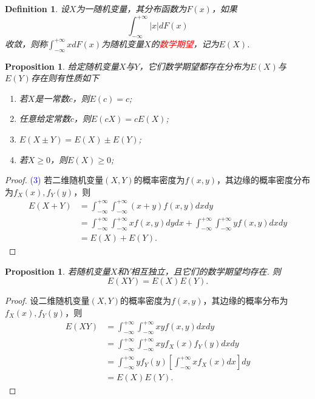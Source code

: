 \documentclass{article}
\newtheorem{proposition}[theorem]{Proposition}
\newtheorem{definition}[theorem]{Definition}
\newcommand{\redt}[1]{\textcolor{red}{#1}}
\newcommand{\bluet}[1]{\textcolor{blue}{#1}}
\begin{document}
\begin{definition}
\rm 设$X$为一随机变量，其分布函数为$F(x)$，如果
$$
\int_{-\infty}^{+\infty} |x|dF(x)
$$
收敛，则称$\int_{-\infty}^{+\infty} xdF(x)$为随机变量$X$的\redt{数学期望}，记为$E(X)$. 
\end{definition}

\begin{proposition}
\rm 给定随机变量$X$与$Y$，它们数学期望都存在分布为$E(X)$与$E(Y)$存在则有性质如下
\begin{enumerate}
	\item 若$X$是一常数$c$，则$E(c) = c$;
	\item 任意给定常数$c$，则$E(cX) = cE(X)$;
	\item $E(X\pm Y) = E(X)\pm E(Y)$;
	\item 若$X \geq 0$，则$E(X) \geq 0$;
\end{enumerate}
\end{proposition}

\begin{proof}
\bluet{(3)} 若二维随机变量$(X,Y)$的概率密度为$f(x,y)$，其边缘的概率密度分布为$f_X(x),f_Y(y)$，则
$$
\begin{array}{ll}
E(X+Y)&=\int_{-\infty}^{+\infty}\int_{-\infty}^{+\infty}(x+y)f(x,y)dxdy \\
&= \int_{-\infty}^{+\infty}\int_{-\infty}^{+\infty}xf(x,y)dydx + \int_{-\infty}^{+\infty}\int_{-\infty}^{+\infty}yf(x,y)dxdy \\
&= E(X) + E(Y).
\end{array}
$$
\end{proof}

\begin{proposition}\label{expectation: independent}
\rm 若随机变量$X$和$Y$相互独立，且它们的数学期望均存在. 则
$$
E(XY)=E(X)E(Y).
$$
\end{proposition}

\begin{proof}
\rm 设二维随机变量$(X,Y)$的概率密度为$f(x,y)$，其边缘的概率分布为$f_X(x),f_Y(y)$，则
$$
\begin{array}{ll}
E(XY) &= \int_{-\infty}^{+\infty}\int_{-\infty}^{+\infty} xyf(x,y)dxdy \\
&= \int_{-\infty}^{+\infty}\int_{-\infty}^{+\infty} xyf_X(x)f_Y(y)dxdy \\
&= \int_{-\infty}^{+\infty}yf_Y(y)\left[\int_{-\infty}^{+\infty}xf_X(x)dx\right]dy\\
&=E(X)E(Y).
\end{array}
$$
\end{proof}
\end{document}

